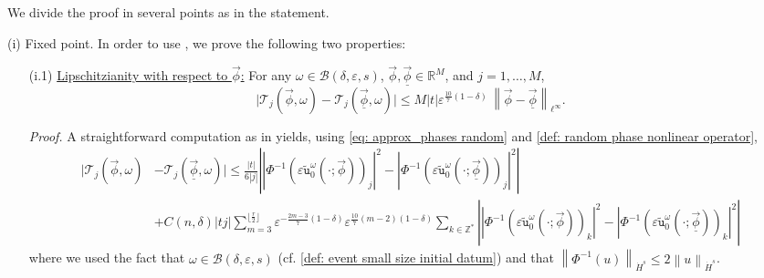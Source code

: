 \documentclass[a4paper,10pt,reqno]{article}
\theoremstyle{definition}
\theoremstyle{plain}
\theoremstyle{plain}
\theoremstyle{definition}
\theoremstyle{plain}
\theoremstyle{plain}
\theoremstyle{plain}
\theoremstyle{definition}
\theoremstyle{definition}
\newcommand{\norm}[1]{\left\lVert #1 \right\rVert}
\def \Z{\mathbb Z}
\def \R{\mathbb R}
\def \tu{\mathtt{u}}
\begin{document}
\medskip

 We divide the proof in several points as in the statement.

\medskip 

\noindent (i) {\sc Fixed point.} In order to use , we prove the following two properties:

\begin{itemize}
\item[(i.1)] \underline{Lipschitzianity with respect to $\vec{\phi}$:} For any $\omega \in \mathcal{B}(\delta,\varepsilon,s)$, $\vec{\phi},\underline{\vec{\phi}} \in \R^M$, and $j = 1, \ldots, M$,
\begin{equation} \label{lipschitz}
\lvert \mathcal{T}_j(\vec{\phi},\omega) - \mathcal{T}_j(\underline{\vec{\phi}},\omega) \rvert \le M |t| \varepsilon^{\frac{10}{7}(1-\delta)} \, \norm{\vec{\phi}-\underline{\vec{\phi}}}_{\ell^{\infty}}.
\end{equation}

\noindent \emph{Proof.} 
A straightforward computation as in  yields, using \eqref{eq: approx_phases random} and \eqref{def: random phase nonlinear operator},
\begin{equation} \label{eq: lip estimate}
\begin{split}
\lvert \mathcal{T}_j(\vec{\phi},\omega) & - \mathcal{T}_j(\underline{\vec{\phi}},\omega) \rvert \le \frac{|t|}{6|j|} \left \lvert |\Phi^{-1}(\varepsilon \widetilde{\tu}_0^{\omega}(\cdot ; \vec{\phi}))_j|^2 - |\Phi^{-1}(\varepsilon \widetilde{\tu}_0^{\omega}(\cdot ; \underline{\vec{\phi}}))_j|^2 \right \rvert \\
& + C(n,\delta) |t j| \sum_{m=3}^{\lfloor \frac{r}{2} \rfloor} \varepsilon^{-\frac{2m-3}{7}(1-\delta)} \varepsilon^{\frac{10}{7} (m-2) (1-\delta)} \sum_{k \in \Z^*} \left \lvert |\Phi^{-1}(\varepsilon \widetilde{\tu}_0^{\omega}(\cdot ; \vec{\phi}))_k|^2 - |\Phi^{-1}(\varepsilon \widetilde{\tu}_0^{\omega}(\cdot ; \underline{\vec{\phi}}))_k|^2 \right \rvert 
\end{split}
\end{equation}
where we used the fact that $\omega \in \mathcal{B}(\delta,\varepsilon,s)$ (cf. \eqref{def: event small size initial datum}) and that $\norm{\Phi^{-1}(u)}_{\dot{H}^s}\leq 2 \norm{u}_{\dot{H}^s}$.


\end{itemize}
\end{document}
